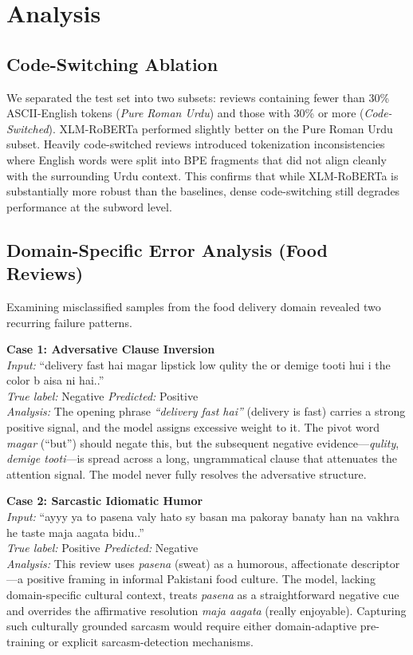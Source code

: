 \documentclass[conference]{IEEEtran}
\begin{document}
\section{Analysis}

\subsection{Code-Switching Ablation}
We separated the test set into two subsets: reviews containing fewer than 30\% ASCII-English tokens (\textit{Pure Roman Urdu}) and those with 30\% or more (\textit{Code-Switched}). XLM-RoBERTa performed slightly better on the Pure Roman Urdu subset. Heavily code-switched reviews introduced tokenization inconsistencies where English words were split into BPE fragments that did not align cleanly with the surrounding Urdu context. This confirms that while XLM-RoBERTa is substantially more robust than the baselines, dense code-switching still degrades performance at the subword level.

\subsection{Domain-Specific Error Analysis (Food Reviews)}
Examining misclassified samples from the food delivery domain revealed two recurring failure patterns.

\vspace{0.1cm}
\textbf{Case 1: Adversative Clause Inversion}\\
\textit{Input:} ``delivery fast hai magar lipstick low qulity the or demige tooti hui i the color b aisa ni hai..''\\
\textit{True label:} Negative \quad \textit{Predicted:} Positive\\
\textit{Analysis:} The opening phrase \textit{``delivery fast hai''} (delivery is fast) carries a strong positive signal, and the model assigns excessive weight to it. The pivot word \textit{magar} (``but'') should negate this, but the subsequent negative evidence---\textit{qulity}, \textit{demige tooti}---is spread across a long, ungrammatical clause that attenuates the attention signal. The model never fully resolves the adversative structure.

\vspace{0.1cm}
\textbf{Case 2: Sarcastic Idiomatic Humor}\\
\textit{Input:} ``ayyy ya to pasena valy hato sy basan ma pakoray banaty han na vakhra he taste maja aagata bidu..''\\
\textit{True label:} Positive \quad \textit{Predicted:} Negative\\
\textit{Analysis:} This review uses \textit{pasena} (sweat) as a humorous, affectionate descriptor---a positive framing in informal Pakistani food culture. The model, lacking domain-specific cultural context, treats \textit{pasena} as a straightforward negative cue and overrides the affirmative resolution \textit{maja aagata} (really enjoyable). Capturing such culturally grounded sarcasm would require either domain-adaptive pre-training or explicit sarcasm-detection mechanisms.
\end{document}
